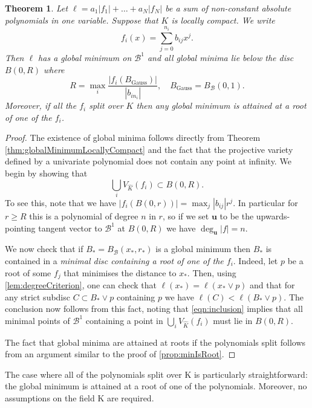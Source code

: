 \documentclass[10pt]{article}
\newtheorem{theorem}{Theorem}[]
\theoremstyle{definition}
\renewcommand{\vec}[1]{\mathbf{#1}}
\begin{document}
\begin{theorem}
  \label{thm:globalMinimumUnivariate}
  Let $\ell = a_1|f_1| + \dotsc + a_N |f_N|$ be a sum of non-constant absolute polynomials in one variable. Suppose that $K$ is locally compact.
  We write
  $$
    f_i(x)  = \sum_{j=0}^{n_i} b_{ij}x^j.
  $$
  Then $\ell$ has a global minimum on $\mathcal B^1$ and all global minima lie below the disc  $B(0, R)$ where
    $$
    R = \max_i \frac{|f_i(B_\mathrm{Gauss})|}{|b_{in_i}|}, \quad B_\mathrm{Gauss} = B_\mathcal{B}(0, 1).
    $$
    Moreover, if all the $f_i$ split over $K$ then any global minimum is attained at a root of one of the $f_i$.
\end{theorem}
\begin{proof}

  The existence of global minima follows directly from Theorem \ref{thm:globalMinimumLocallyCompact} and the fact that the projective variety defined by a univariate polynomial does not contain any point at infinity.
  We begin by showing that
  \begin{equation} \label{eqn:inclusion}
    \bigcup_i V_{\hat{K}} (f_i) \subset B(0, R).
  \end{equation}
  To see this, note that we have
  $
  |f_i(B(0, r))| = \max_j |b_{ij}| r^j.
  $
  In particular for $r \ge R$ this is a polynomial of degree $n$ in $r$, so if we set $\vec{u}$ to be the upwards-pointing tangent vector to $\mathcal{B}^1$ at $B(0, R)$ we have
  $
  \deg_\vec{u} \lvert f \rvert  = n.
  $
  
  We now check that if $B_* = B_\mathcal{B}(x_*, r_*)$ is a global minimum then $B_*$ is contained in a \emph{minimal disc containing a root of one of the $f_i$}. Indeed, let $p$ be a root of some $f_j$ that minimises the distance to $x_*$. Then, using \cref{lem:degreeCriterion}, one can check that $\ell(x_*) = \ell(x_* \vee p)$ and that for any strict subdisc $C \subset B_* \vee p$ containing $p$ we have $\ell(C) < \ell(B_* \vee p)$.
  The conclusion now follows from this fact, noting that \eqref{eqn:inclusion} implies that all minimal points of $\mathcal{B}^1$ containing a point in $\bigcup_i V_{\hat{K}} (f_i)$ must lie in $B(0, R)$.

  The fact that global minima are attained at roots if the polynomials split follows from an argument similar to the proof of \cref{prop:minIsRoot}.
\end{proof}

The case where all of the polynomials split over K is particularly straightforward: the global minimum is attained at a root of one of the polynomials. Moreover, no assumptions on the field K are required.
\end{document}
